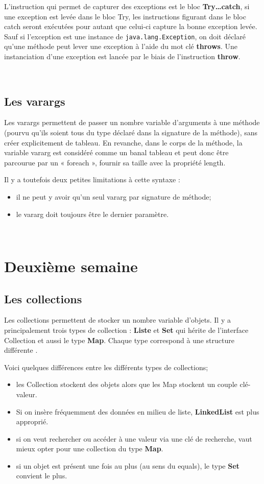 \documentclass[12pt]{report}
\begin{document}
L'instruction qui permet de capturer des exceptions est le bloc \textbf{Try{…}catch{}}, si une exception est levée dans le bloc Try, les instructions figurant dans le bloc catch seront exécutées pour autant que celui-ci capture la bonne exception levée. Sauf si l'exception est une instance de \texttt{java.lang.Exception}, on doit déclaré qu'une méthode peut lever une exception à l'aide du mot clé \textbf{throws}. Une instanciation d'une exception est lancée par le biais de l'instruction \textbf{throw}.
\newpage

~\\
\subsection{Les varargs}
Les varargs permettent de passer un nombre variable d’arguments à une méthode (pourvu qu’ils soient tous du type déclaré dans la signature de la méthode), sans créer explicitement de tableau. En revanche, dans le corps de la méthode, la variable vararg est considéré comme un banal tableau et peut donc être parcourue par un « foreach », fournir sa taille avec la propriété length.\newline

Il y a toutefois deux petites limitations à cette syntaxe :

\begin{itemize} 
\item il ne peut y avoir qu’un seul vararg par signature de méthode;
\item le vararg doit toujours être le dernier paramètre.
\end{itemize}

~\\
\section{Deuxième semaine}

\subsection{Les collections}
Les collections permettent de stocker un nombre variable d'objets. Il y a principalement trois types de collection : \textbf{Liste} et \textbf{Set} qui hérite de l'interface Collection et aussi le type \textbf{Map}. Chaque type correspond à une structure différente .\newline

Voici quelques différences entre les différents types de collections;
\begin{itemize}
\item les Collection stockent des objets alors que les Map stockent un couple clé-valeur.
\item Si on insère fréquemment des données en milieu de liste, \textbf{LinkedList} est plus approprié.
\item si on veut rechercher ou accéder à une valeur via une clé de recherche, vaut mieux opter pour une collection du type \textbf{Map}.
\item si un objet est présent une fois au plus (au sens du equals), le type \textbf{Set} convient le plus.
\end{itemize}
\end{document}
